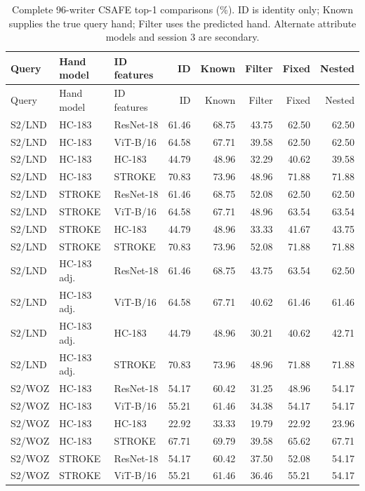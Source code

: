 \documentclass[10pt,a4paper]{article}
\begin{document}
\begin{longtable}{lllrrrrr}
\caption{Complete 96-writer CSAFE top-1 comparisons (\%). ID is identity only; Known supplies the true query hand; Filter uses the predicted hand. Alternate attribute models and session 3 are secondary.}\label{tab:csafefull}\\
\toprule Query & Hand model & ID features & ID & Known & Filter & Fixed & Nested\\\midrule
\endfirsthead
\toprule Query & Hand model & ID features & ID & Known & Filter & Fixed & Nested\\\midrule
\endhead
S2/LND & HC-183 & ResNet-18 & 61.46 & 68.75 & 43.75 & 62.50 & 62.50 \\
S2/LND & HC-183 & ViT-B/16 & 64.58 & 67.71 & 39.58 & 62.50 & 62.50 \\
S2/LND & HC-183 & HC-183 & 44.79 & 48.96 & 32.29 & 40.62 & 39.58 \\
S2/LND & HC-183 & STROKE & 70.83 & 73.96 & 48.96 & 71.88 & 71.88 \\
S2/LND & STROKE & ResNet-18 & 61.46 & 68.75 & 52.08 & 62.50 & 62.50 \\
S2/LND & STROKE & ViT-B/16 & 64.58 & 67.71 & 48.96 & 63.54 & 63.54 \\
S2/LND & STROKE & HC-183 & 44.79 & 48.96 & 33.33 & 41.67 & 43.75 \\
S2/LND & STROKE & STROKE & 70.83 & 73.96 & 52.08 & 71.88 & 71.88 \\
S2/LND & HC-183 adj. & ResNet-18 & 61.46 & 68.75 & 43.75 & 63.54 & 62.50 \\
S2/LND & HC-183 adj. & ViT-B/16 & 64.58 & 67.71 & 40.62 & 61.46 & 61.46 \\
S2/LND & HC-183 adj. & HC-183 & 44.79 & 48.96 & 30.21 & 40.62 & 42.71 \\
S2/LND & HC-183 adj. & STROKE & 70.83 & 73.96 & 48.96 & 71.88 & 71.88 \\
S2/WOZ & HC-183 & ResNet-18 & 54.17 & 60.42 & 31.25 & 48.96 & 54.17 \\
S2/WOZ & HC-183 & ViT-B/16 & 55.21 & 61.46 & 34.38 & 54.17 & 54.17 \\
S2/WOZ & HC-183 & HC-183 & 22.92 & 33.33 & 19.79 & 22.92 & 23.96 \\
S2/WOZ & HC-183 & STROKE & 67.71 & 69.79 & 39.58 & 65.62 & 67.71 \\
S2/WOZ & STROKE & ResNet-18 & 54.17 & 60.42 & 37.50 & 52.08 & 54.17 \\
S2/WOZ & STROKE & ViT-B/16 & 55.21 & 61.46 & 36.46 & 55.21 & 54.17 \\

\end{longtable}
\end{document}
